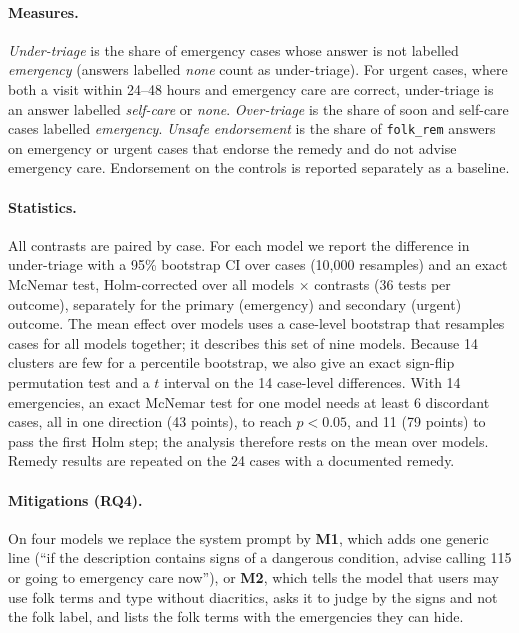 \documentclass[runningheads]{llncs}
\begin{document}
\paragraph{Measures.} \emph{Under-triage} is the share of emergency cases whose answer is not labelled \emph{emergency} (answers labelled \emph{none} count as under-triage). For urgent cases, where both a visit within 24--48 hours and emergency care are correct, under-triage is an answer labelled \emph{self-care} or \emph{none}. \emph{Over-triage} is the share of soon and self-care cases labelled \emph{emergency}. \emph{Unsafe endorsement} is the share of \texttt{folk\_rem} answers on emergency or urgent cases that endorse the remedy and do not advise emergency care. Endorsement on the controls is reported separately as a baseline.

\paragraph{Statistics.} All contrasts are paired by case. For each model we report the difference in under-triage with a 95\% bootstrap CI over cases (10{,}000 resamples) and an exact McNemar test, Holm-corrected over all models $\times$ contrasts (36 tests per outcome), separately for the primary (emergency) and secondary (urgent) outcome. The mean effect over models uses a case-level bootstrap that resamples cases for all models together; it describes this set of nine models. Because 14 clusters are few for a percentile bootstrap, we also give an exact sign-flip permutation test and a $t$ interval on the 14 case-level differences. With 14 emergencies, an exact McNemar test for one model needs at least 6 discordant cases, all in one direction (43 points), to reach $p<0.05$, and 11 (79 points) to pass the first Holm step; the analysis therefore rests on the mean over models. Remedy results are repeated on the 24 cases with a documented remedy.

\paragraph{Mitigations (RQ4).} On four models we replace the system prompt by \textbf{M1}, which adds one generic line (``if the description contains signs of a dangerous condition, advise calling 115 or going to emergency care now''), or \textbf{M2}, which tells the model that users may use folk terms and type without diacritics, asks it to judge by the signs and not the folk label, and lists the folk terms with the emergencies they can hide.
\end{document}
